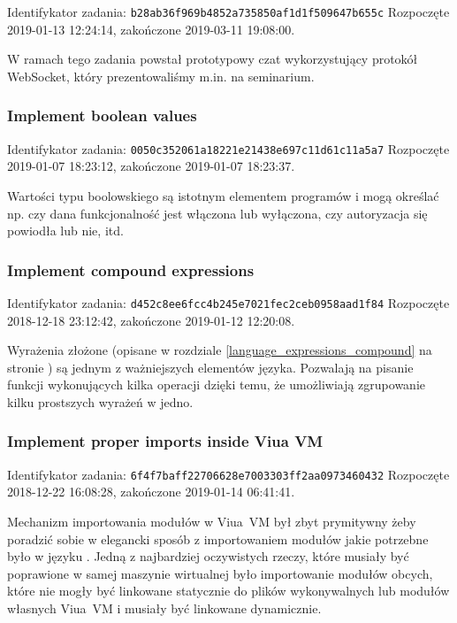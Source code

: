 Identifykator zadania: \texttt{b28ab36f969b4852a735850af1d1f509647b655c}
\newline
Rozpoczęte 2019-01-13 12:24:14, zakończone 2019-03-11 19:08:00.
\newline

W ramach tego zadania powstał prototypowy czat wykorzystujący protokół
WebSocket, który prezentowaliśmy m.in. na seminarium.

\subsubsection{Implement boolean values}

Identifykator zadania: \texttt{0050c352061a18221e21438e697c11d61c11a5a7}
\newline
Rozpoczęte 2019-01-07 18:23:12, zakończone 2019-01-07 18:23:37.
\newline

Wartości typu boolowskiego są istotnym elementem programów i mogą określać np.
czy dana funkcjonalność jest włączona lub wyłączona, czy autoryzacja się
powiodła lub nie, itd.

\subsubsection{Implement compound expressions}

Identifykator zadania: \texttt{d452c8ee6fcc4b245e7021fec2ceb0958aad1f84}
\newline
Rozpoczęte 2018-12-18 23:12:42, zakończone 2019-01-12 12:20:08.
\newline

Wyrażenia złożone (opisane w rozdziale \ref{language_expressions_compound} na
stronie \pageref{language_expressions_compound}) są jednym z ważniejszych
elementów języka. Pozwalają na pisanie funkcji wykonujących kilka operacji
dzięki temu, że umożliwiają zgrupowanie kilku prostszych wyrażeń w jedno.

\subsubsection{Implement proper imports inside Viua VM}

Identifykator zadania: \texttt{6f4f7baff22706628e7003303ff2aa0973460432}
\newline
Rozpoczęte 2018-12-22 16:08:28, zakończone 2019-01-14 06:41:41.
\newline

Mechanizm importowania modułów w Viua~VM był zbyt prymitywny żeby poradzić sobie
w elegancki sposób z importowaniem modułów jakie potrzebne było w języku
\ViuAct. Jedną z najbardziej oczywistych rzeczy, które musiały być poprawione w
samej maszynie wirtualnej było importowanie modułów obcych, które nie mogły być
linkowane statycznie do plików wykonywalnych lub modułów własnych Viua~VM i
musiały być linkowane dynamicznie.

